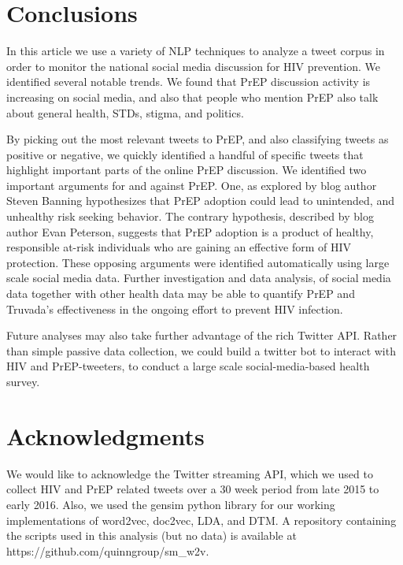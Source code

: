\documentclass{sig-alternate-05-2015}
\begin{document}
\section{Conclusions}

In this article we use a variety of NLP techniques to analyze a tweet corpus in order to monitor the national social media discussion for HIV prevention. We identified several notable trends. We found that PrEP discussion activity is increasing on social media, and also that people who mention PrEP also talk about general health, STDs, stigma, and politics.

By picking out the most relevant tweets to PrEP, and also classifying tweets as positive or negative, we quickly identified a handful of specific tweets that highlight important parts of the online PrEP discussion. We identified two important arguments for and against PrEP. One, as explored by blog author Steven Banning hypothesizes that PrEP adoption could lead to unintended, and unhealthy risk seeking behavior. The contrary hypothesis, described by blog author Evan Peterson, suggests that PrEP adoption is a product of healthy, responsible at-risk individuals who are gaining an effective form of HIV protection. These opposing arguments were identified automatically using large scale social media data. Further investigation and data analysis, of social media data together with other health data may be able to quantify PrEP and Truvada's effectiveness in the ongoing effort to prevent HIV infection.

Future analyses may also take further advantage of the rich Twitter API. Rather than simple passive data collection, we could build a twitter bot to interact with HIV and PrEP-tweeters, to conduct a large scale social-media-based health survey.


\section{Acknowledgments}

We would like to acknowledge the Twitter streaming API, which we used to collect HIV and PrEP related tweets over a 30 week period from late 2015 to early 2016. Also, we used the gensim python library for our working implementations of word2vec, doc2vec, LDA, and DTM. A repository containing the scripts used in this analysis (but no data) is available at https://github.com/quinngroup/sm\_w2v.

%

%
%





\end{document}
